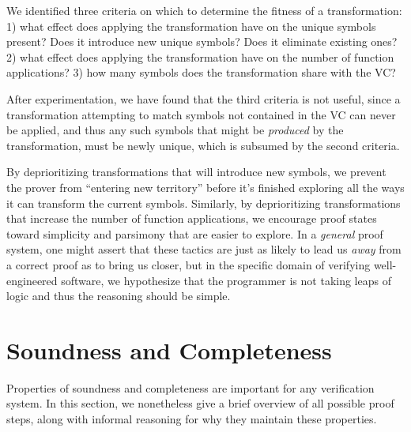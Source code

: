 We identified three criteria on which to determine the fitness of a transformation: 1) what effect does applying the transformation have on the unique symbols present?  Does it introduce new unique symbols?  Does it eliminate existing ones? 2) what effect does applying the transformation have on the number of function applications? 3) how many symbols does the transformation share with the VC?

After experimentation, we have found that the third criteria is not useful, since a transformation attempting to match symbols not contained in the VC can never be applied, and thus any such symbols that might be \emph{produced} by the transformation, must be newly unique, which is subsumed by the second criteria.

By deprioritizing transformations that will introduce new symbols, we prevent the prover from ``entering new territory'' before it's finished exploring all the ways it can transform the current symbols.  Similarly, by deprioritizing transformations that increase the number of function applications, we encourage proof states toward simplicity and parsimony that are easier to explore.  In a \emph{general} proof system, one might assert that these tactics are just as likely to lead us \emph{away} from a correct proof as to bring us closer, but in the specific domain of verifying well-engineered software, we hypothesize that the programmer is not taking leaps of logic and thus the reasoning should be simple.


\section{Soundness and Completeness}
Properties of soundness and completeness are important for any verification system.  In this section, we nonetheless give a brief overview of all possible proof steps, along with informal reasoning for why they maintain these properties.

